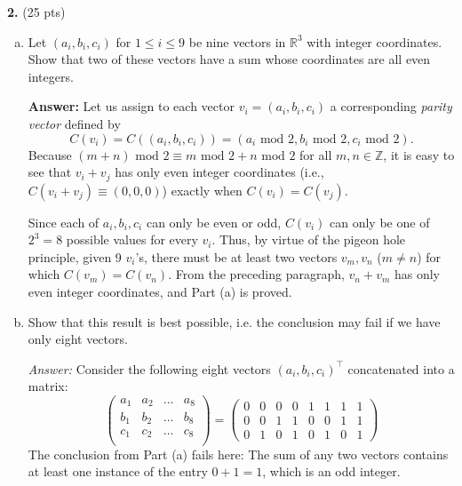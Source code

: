 \documentclass[11pt]{article}
\begin{document}
\newpage


\noindent \textbf{2.} (25 pts)
\begin{enumerate}[(a)]
	\item Let $(a_i, b_i, c_i)$ for $1 \leq i \leq 9$ be nine vectors in $\mathbb{R}^3$ with integer coordinates. Show that two of these vectors have a sum whose coordinates are all even integers.
	
	\textbf{Answer:} Let us assign to each vector $v_i = (a_i,b_i,c_i)$ a corresponding \textit{parity vector} defined by 
	\begin{equation*}
	C(v_i) = C((a_i,b_i,c_i)) = (a_i \text{ mod } 2, b_i \text{ mod } 2, c_i \text{ mod } 2).
	\end{equation*} 
	Because $(m+n) \text{ mod } 2 \equiv m \text{ mod }2 + n \text{ mod }2$ for all $m,n\in \mathbb{Z}$, it is easy to see that $v_i + v_j$ has only even integer coordinates (i.e., $C(v_i+v_j) \equiv (0,0,0)$) exactly when $C(v_i) = C(v_j)$.
	
	Since each of $a_i,b_i,c_i$ can only be even or odd, $C(v_i)$ can only be one of $2^3 = 8$ possible values for every $v_i$. Thus, by virtue of the pigeon hole principle, given 9 $v_i$'s, there must be at least two vectors $v_m,v_n$ ($m\neq n$) for which $C(v_m) = C(v_n)$. From the preceding paragraph, $v_n + v_m$ has only even integer coordinates, and Part (a) is proved. 
	
	
	\item Show that this result is best possible, i.e. the conclusion may fail if we have only eight vectors. 
	
	\textit{Answer:} Consider the following eight vectors $(a_i,b_i,c_i)^\top$ concatenated into a matrix:
	\begin{equation*}
	\begin{pmatrix}
	a_1 & a_2 & \dots & a_8\\
	b_1 & b_2 & \dots & b_8\\
	c_1 & c_2 & \dots & c_8\\
	\end{pmatrix}
	=
	\begin{pmatrix}
	0&0&0&0&1&1&1&1\\
	0&0&1&1&0&0&1&1\\
	0&1&0&1&0&1&0&1
	\end{pmatrix}
	\end{equation*}
	The conclusion from Part (a) fails here: The sum of any two vectors contains at least one instance of the entry $0+1=1$, which is an odd integer.
\end{enumerate}
\end{document}
